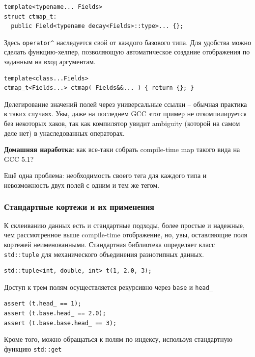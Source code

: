 \documentclass[a4paper,12pt,oneside]{article}
\begin{document}
\begin{lstlisting}
template<typename... Fields>
struct ctmap_t: 
  public Field<typename decay<Fields>::type>... {};
\end{lstlisting}

Здесь \lstinline!operator^! наследуется свой от каждого базового типа. Для удобства можно сделать функцию-хелпер, позволяющую автоматическое создание отображения по заданным на вход аргументам.

\begin{lstlisting}
template<class...Fields>
ctmap_t<Fields...> ctmap( Fields&&... ) { return {}; }
\end{lstlisting}

Делегирование значений полей через универсальные ссылки -- обычная практика в таких случаях. Увы, даже на последнем GCC этот пример не откомпилируется без некоторых хаков, так как компилятор увидит ambiguity (которой на самом деле нет) в унаследованных операторах.

\textbf{Домашняя наработка:} как все-таки собрать compile-time map такого вида на GCC 5.1?

Ещё одна проблема: необходимость своего тега для каждого типа и невозможность двух полей с одним и тем же тегом.

\subsubsection{Стандартные кортежи и их применения}\label{StdTuples}

К склеиванию данных есть и стандартные подходы, более простые и надежные, чем рассмотренное выше compile-time отображение, но, увы, оставляющие поля кортежей неименованными. Стандартная библиотека определяет класс \lstinline!std::tuple! для механического объединения разнотипных данных.

\begin{lstlisting}
std::tuple<int, double, int> t(1, 2.0, 3);
\end{lstlisting}

Доступ к трем полям осуществляется рекурсивно через \lstinline!base! и \lstinline!head_!

\begin{lstlisting}
assert (t.head_ == 1);
assert (t.base.head_ == 2.0);
assert (t.base.base.head_ == 3);
\end{lstlisting}

Кроме того, можно обращаться к полям по индексу, используя стандартную функцию \lstinline!std::get!
\end{document}

